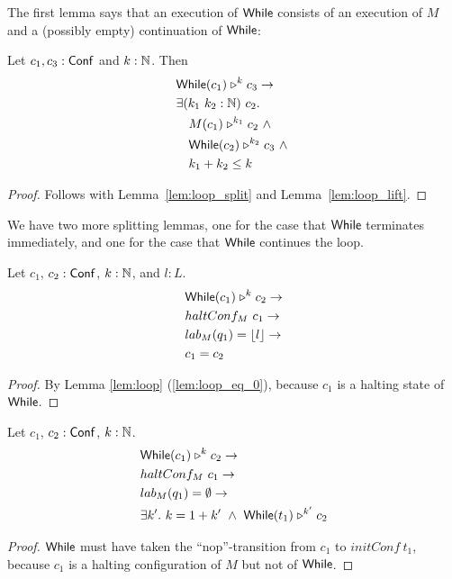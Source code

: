 The first lemma says that an execution of $\mathsf{While}$ consists of an execution of $M$ and a (possibly empty) continuation of $\mathsf{While}$:
\begin{lemma}
  \label{lem:While_split}
  Let $c_1, c_3 : \mathsf{Conf}$ and $k:\mathbb{N}$.  Then
  \begin{alignat*}{1}
    & \mathsf{While}(c_1) \mathrel{\triangleright}^k c_3 \rightarrow \\
    & \exists (k_1~k_2 : \mathbb{N})~c_2. \\
    & \quad M(c_1) \mathrel{\triangleright}^{k_1} c_2 ~\land~ \\
    & \quad \mathsf{While}(c_2) \mathrel{\triangleright}^{k_2} c_3 ~\land~\\
    & \quad k_1 + k_2 \leq k
  \end{alignat*}
\end{lemma}
\begin{proof}
  Follows with Lemma~\ref{lem:loop_split} and Lemma~\ref{lem:loop_lift}.
\end{proof}

We have two more splitting lemmas, one for the case that $\mathsf{While}$ terminates immediately, and one for the case that $\mathsf{While}$ continues the loop.
\begin{lemma}
  \label{lem:While_split_term}
  Let $c_1$, $c_2 : \mathsf{Conf}$, $k:\mathbb{N}$, and $l:L$.
  \begin{alignat*}{1}
    & \mathsf{While}(c_1) \mathrel{\triangleright}^k c_2 \rightarrow \\
    & haltConf_M~c_1 \rightarrow \\
    & lab_M(q_1) = \left\lfloor {l} \right\rfloor \rightarrow \\
    & c_1 = c_2
  \end{alignat*}
\end{lemma}
\begin{proof}
  By Lemma \ref{lem:loop} (\ref{lem:loop_eq_0}), because $c_1$ is a halting state of $\mathsf{While}$.
\end{proof}
\begin{lemma}
  \label{lem:While_split_repeat}
  Let $c_1$, $c_2 : \mathsf{Conf}$, $k:\mathbb{N}$.
  \begin{alignat*}{1}
    & \mathsf{While}(c_1) \mathrel{\triangleright}^k c_2 \rightarrow \\
    & haltConf_M~c_1 \rightarrow \\
    & lab_M(q_1) = \emptyset \rightarrow \\
    & \exists k'.~k = 1+k' ~\land~ \mathsf{While}(t_1) \mathrel{\triangleright}^{k'} c_2
  \end{alignat*}
\end{lemma}
\begin{proof}
  $\mathsf{While}$ must have taken the ``nop''-transition from $c_1$ to $initConf~t_1$, because $c_1$ is a halting configuration of $M$ but not of $\mathsf{While}$.
\end{proof}

